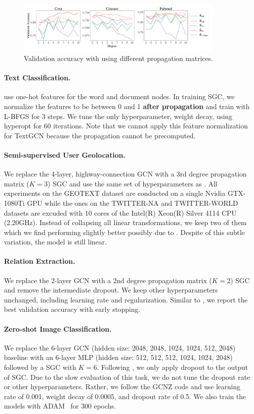 \begin{figure}[htb] 
\centering
\includegraphics[width=0.9\textwidth]{figures/propagation.pdf}
\caption{Validation accuracy with \method{} using different propagation matrices.}
\label{fig:propagation-ablation}
\end{figure}
%
\paragraph{Text Classification.} 
\citet{textGCN} use one-hot features for the word and document nodes. In training SGC, we normalize the features to be between 0 and 1 \textbf{after propagation} and train with L-BFGS for 3 steps. We tune the only hyperparameter, weight decay, using hyperopt\cite{hyperopt} for 60 iterations. Note that we cannot apply this feature normalization for TextGCN because the propagation cannot be precomputed. 
%
\paragraph{Semi-supervised User Geolocation.}
We replace the 4-layer, highway-connection GCN with a 3rd degree propagation matrix ($K=3$) SGC and use the same set of hyperparameters as \citet{Rahimi18}. All experiments on the GEOTEXT dataset are conducted on a single Nvidia GTX-1080Ti GPU while the ones on the TWITTER-NA and TWITTER-WORLD datasets are excuded with 10 cores of the Intel(R) Xeon(R) Silver 4114 CPU (2.20GHz). Instead of collapsing all linear transformations, we keep two of them which we find performing slightly better possibly due to . Despite of this subtle variation, the model is still linear.
%
\paragraph{Relation Extraction.}
We replace the 2-layer GCN with a 2nd degree propagation matrix ($K=2$) SGC and remove the intermediate dropout. We keep other hyperparameters unchanged, including learning rate and regularization. Similar to \citet{relation-extraction}, we report the best validation accuracy with early stopping.
%
\paragraph{Zero-shot Image Classification.}
We replace the 6-layer GCN (hidden size: 2048, 2048, 1024, 1024, 512, 2048) baseline with an 6-layer MLP (hidden size: 512, 512, 512, 1024, 1024, 2048) followed by a SGC with $K=6$. Following \cite{wang2018zero}, we only apply dropout to the output of SGC. Due to the slow evaluation of this task, we do not tune the dropout rate or other hyperparameters. Rather, we follow the GCNZ code and use learning rate of 0.001, weight decay of 0.0005, and dropout rate of 0.5. We also train the models with ADAM~\cite{adam} for 300 epochs.

